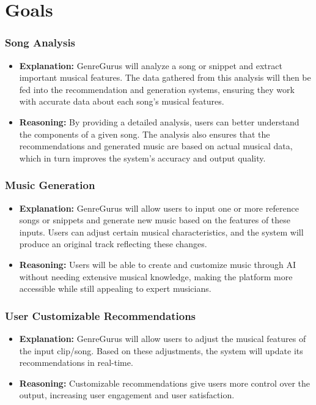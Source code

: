 \documentclass{article}
\begin{document}
\section{Goals}
\subsubsection*{Song Analysis}
\begin{itemize}
    \item \textbf{Explanation:} GenreGurus will analyze a song or snippet and extract important musical features. The data gathered from this analysis will then be fed into the recommendation and generation systems, ensuring they work with accurate data about each song's musical features.
    \item \textbf{Reasoning:} By providing a detailed analysis, users can better understand the components of a given song. The analysis also ensures that the recommendations and generated music are based on actual musical data, which in turn improves the system’s accuracy and output quality.
\end{itemize}

\subsubsection*{Music Generation}
\begin{itemize}
    \item \textbf{Explanation:} GenreGurus will allow users to input one or more reference songs or snippets and generate new music based on the features of these inputs. Users can adjust certain musical characteristics, and the system will produce an original track reflecting these changes.
    \item \textbf{Reasoning:} Users will be able to create and customize music through AI without needing extensive musical knowledge, making the platform more accessible while still appealing to expert musicians.
\end{itemize}

\subsubsection*{User Customizable Recommendations}
\begin{itemize}
    \item \textbf{Explanation:} GenreGurus will allow users to adjust the musical features of the input clip/song. Based on these adjustments, the system will update its recommendations in real-time.
    \item \textbf{Reasoning:} Customizable recommendations give users more control over the output, increasing user engagement and user satisfaction.
\end{itemize}
\end{document}
